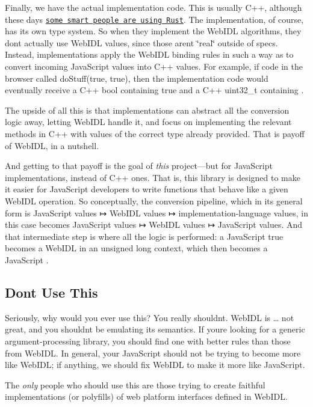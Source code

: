 Finally, we have the actual implementation code. This is usually C++, although these days \href{https://github.com/servo/servo}{\tt some smart people are using Rust}. The implementation, of course, has its own type system. So when they implement the Web\+I\+DL algorithms, they don\textquotesingle{}t actually use Web\+I\+DL values, since those aren\textquotesingle{}t \char`\"{}real\char`\"{} outside of specs. Instead, implementations apply the Web\+I\+DL binding rules in such a way as to convert incoming Java\+Script values into C++ values. For example, if code in the browser called {\ttfamily do\+Stuff(true, true)}, then the implementation code would eventually receive a C++ {\ttfamily bool} containing {\ttfamily true} and a C++ {\ttfamily uint32\+\_\+t} containing {}.

The upside of all this is that implementations can abstract all the conversion logic away, letting Web\+I\+DL handle it, and focus on implementing the relevant methods in C++ with values of the correct type already provided. That is payoff of Web\+I\+DL, in a nutshell.

And getting to that payoff is the goal of {\itshape this} project—but for Java\+Script implementations, instead of C++ ones. That is, this library is designed to make it easier for Java\+Script developers to write functions that behave like a given Web\+I\+DL operation. So conceptually, the conversion pipeline, which in its general form is Java\+Script values ↦ Web\+I\+DL values ↦ implementation-\/language values, in this case becomes Java\+Script values ↦ Web\+I\+DL values ↦ Java\+Script values. And that intermediate step is where all the logic is performed\+: a Java\+Script {\ttfamily true} becomes a Web\+I\+DL {} in an unsigned long context, which then becomes a Java\+Script {}.

\subsection*{Don\textquotesingle{}t Use This}

Seriously, why would you ever use this? You really shouldn\textquotesingle{}t. Web\+I\+DL is … not great, and you shouldn\textquotesingle{}t be emulating its semantics. If you\textquotesingle{}re looking for a generic argument-\/processing library, you should find one with better rules than those from Web\+I\+DL. In general, your Java\+Script should not be trying to become more like Web\+I\+DL; if anything, we should fix Web\+I\+DL to make it more like Java\+Script.

The {\itshape only} people who should use this are those trying to create faithful implementations (or polyfills) of web platform interfaces defined in Web\+I\+DL. 